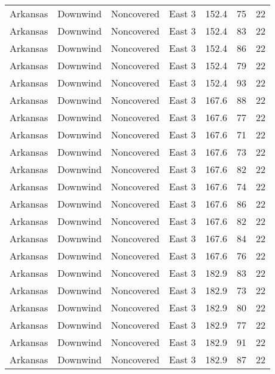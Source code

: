 \documentclass{article}
\begin{document}
\begin{longtable}[H]{ccccccc}
Arkansas & Downwind  & Noncovered & East 3        & 152.4        & 75          & 22  \\
Arkansas & Downwind  & Noncovered & East 3        & 152.4        & 83          & 22  \\
Arkansas & Downwind  & Noncovered & East 3        & 152.4        & 86          & 22  \\
Arkansas & Downwind  & Noncovered & East 3        & 152.4        & 79          & 22  \\
Arkansas & Downwind  & Noncovered & East 3        & 152.4        & 93          & 22  \\
Arkansas & Downwind  & Noncovered & East 3        & 167.6        & 88          & 22  \\
Arkansas & Downwind  & Noncovered & East 3        & 167.6        & 77          & 22  \\
Arkansas & Downwind  & Noncovered & East 3        & 167.6        & 71          & 22  \\
Arkansas & Downwind  & Noncovered & East 3        & 167.6        & 73          & 22  \\
Arkansas & Downwind  & Noncovered & East 3        & 167.6        & 82          & 22  \\
Arkansas & Downwind  & Noncovered & East 3        & 167.6        & 74          & 22  \\
Arkansas & Downwind  & Noncovered & East 3        & 167.6        & 86          & 22  \\
Arkansas & Downwind  & Noncovered & East 3        & 167.6        & 82          & 22  \\
Arkansas & Downwind  & Noncovered & East 3        & 167.6        & 84          & 22  \\
Arkansas & Downwind  & Noncovered & East 3        & 167.6        & 76          & 22  \\
Arkansas & Downwind  & Noncovered & East 3        & 182.9        & 83          & 22  \\
Arkansas & Downwind  & Noncovered & East 3        & 182.9        & 73          & 22  \\
Arkansas & Downwind  & Noncovered & East 3        & 182.9        & 80          & 22  \\
Arkansas & Downwind  & Noncovered & East 3        & 182.9        & 77          & 22  \\
Arkansas & Downwind  & Noncovered & East 3        & 182.9        & 91          & 22  \\
Arkansas & Downwind  & Noncovered & East 3        & 182.9        & 87          & 22  \\

\end{longtable}
\end{document}
